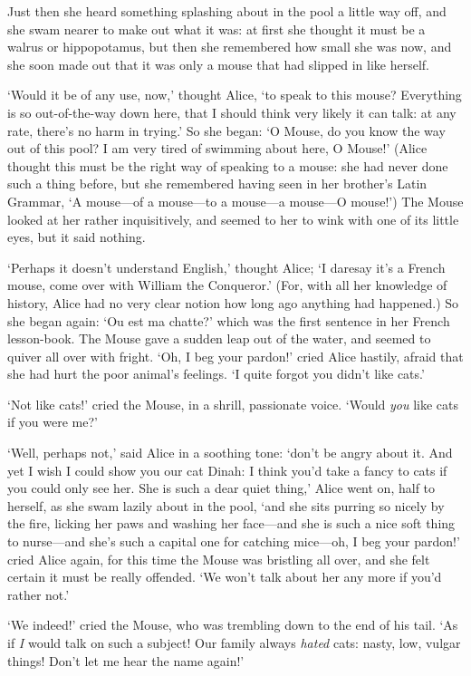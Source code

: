 \documentclass[12pt,openany]{memoir}
\begin{document}
Just then she heard something splashing about in the pool a little way off, and she swam nearer to make out what it was: at first she thought it must be a walrus or hippopotamus, but then she remembered how small she was now, and she soon made out that it was only a mouse that had slipped in like herself.

`Would it be of any use, now,' thought Alice, `to speak to this mouse? Everything is so out-of-the-way down here, that I should think very likely it can talk: at any rate, there's no harm in trying.' So she began: `O Mouse, do you know the way out of this pool? I am very tired of swimming about here, O Mouse!' (Alice thought this must be the right way of speaking to a mouse: she had never done such a thing before, but she remembered having seen in her brother's Latin Grammar, `A mouse---of a mouse---to a mouse---a mouse---O mouse!') The Mouse looked at her rather inquisitively, and seemed to her to wink with one of its little eyes, but it said nothing.

`Perhaps it doesn't understand English,' thought Alice; `I daresay it's a French mouse, come over with William the Conqueror.' (For, with all her knowledge of history, Alice had no very clear notion how long ago anything had happened.) So she began again: `Ou est ma chatte?' which was the first sentence in her French lesson-book. The Mouse gave a sudden leap out of the water, and seemed to quiver all over with fright. `Oh, I beg your pardon!' cried Alice hastily, afraid that she had hurt the poor animal's feelings. `I quite forgot you didn't like cats.'

`Not like cats!' cried the Mouse, in a shrill, passionate voice. `Would \textit{you} like cats if you were me?'

`Well, perhaps not,' said Alice in a soothing tone: `don't be angry about it. And yet I wish I could show you our cat Dinah: I think you'd take a fancy to cats if you could only see her. She is such a dear quiet thing,' Alice went on, half to herself, as she swam lazily about in the pool, `and she sits purring so nicely by the fire, licking her paws and washing her face---and she is such a nice soft thing to nurse---and she's such a capital one for catching mice---oh, I beg your pardon!' cried Alice again, for this time the Mouse was bristling all over, and she felt certain it must be really offended. `We won't talk about her any more if you'd rather not.'

`We indeed!' cried the Mouse, who was trembling down to the end of his tail. `As if \textit{I} would talk on such a subject! Our family always \textit{hated} cats: nasty, low, vulgar things! Don't let me hear the name again!'
\end{document}

